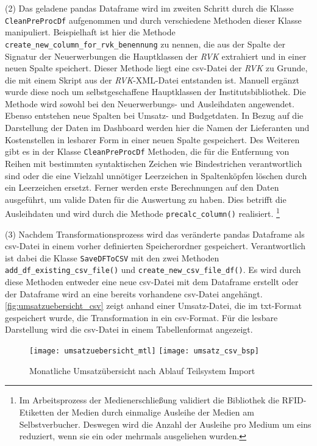     (2) Das geladene pandas Dataframe wird im zweiten Schritt durch die Klasse \texttt{CleanPreProcDf} aufgenommen und durch verschiedene Methoden dieser Klasse
    manipuliert. Beispielhaft ist hier die Methode \texttt{create\_new\_column\_for\_rvk\_benennung} zu nennen, die aus der Spalte der Signatur 
    der Neuerwerbungen die Hauptklassen der \textit{\acrlong{RVK}} extrahiert und in einer neuen Spalte speichert. Dieser Methode liegt eine csv-Datei
    der \textit{\acrshort{RVK}} zu Grunde, die mit einem Skript aus der \textit{\acrshort{RVK}}-XML-Datei entstanden ist. Manuell ergänzt wurde diese 
    noch um selbstgeschaffene Hauptklassen der Institutsbibliothek. Die Methode wird sowohl bei den Neuerwerbungs- und Ausleihdaten angewendet.
    Ebenso entstehen neue Spalten bei Umsatz- und Budgetdaten. In Bezug auf die Darstellung der Daten im Dashboard werden
    hier die Namen der Lieferanten und Kostenstellen in lesbarer Form in einer neuen Spalte gespeichert. 
    Des Weiteren gibt es in der Klasse \texttt{CleanPreProcDf} Methoden, die für die Entfernung von Reihen mit bestimmten syntaktischen Zeichen wie Bindestrichen 
    verantwortlich sind oder die eine Vielzahl unnötiger Leerzeichen in Spaltenköpfen löschen durch ein Leerzeichen ersetzt.
    Ferner werden erste Berechnungen auf den Daten ausgeführt, um valide Daten für die Auswertung zu haben. Dies betrifft die Ausleihdaten und wird durch die
    Methode \texttt{precalc\_column()} realisiert.
    \footnote{Im Arbeitsprozess der Medienerschließung validiert die Bibliothek die RFID-Etiketten der Medien durch einmalige Ausleihe der Medien am Selbstverbucher.
    Deswegen wird die Anzahl der Ausleihe pro Medium um eins reduziert, wenn sie ein oder mehrmals ausgeliehen wurden.}
     
    (3) Nachdem Transformationsprozess wird das veränderte pandas Dataframe als csv-Datei in einem vorher definierten Speicherordner gespeichert. 
    Verantwortlich ist dabei die Klasse \texttt{SaveDFToCSV} mit den zwei Methoden \texttt{add\_df\_existing\_csv\_file()} und 
    \texttt{create\_new\_csv\_file\_df()}. 
    Es wird durch diese Methoden entweder eine neue csv-Datei mit dem Dataframe erstellt oder der Dataframe wird an eine bereits vorhandene csv-Datei angehängt.
    \autoref{fig:umsatzuebersicht_csv} zeigt anhand einer Umsatz-Datei, die im txt-Format gespeichert wurde, die Transformation
    in ein csv-Format. Für die lesbare Darstellung wird die csv-Datei in einem Tabellenformat angezeigt.

    \begin{figure}[H]
        \centering
            \texttt{[image: umsatzuebersicht\_mtl]}
            \texttt{[image: umsatz\_csv\_bsp]}
            \caption{Monatliche Umsatzübersicht nach Ablauf Teilsystem Import}
            \label{fig:umsatzuebersicht_csv}
    \end{figure}

